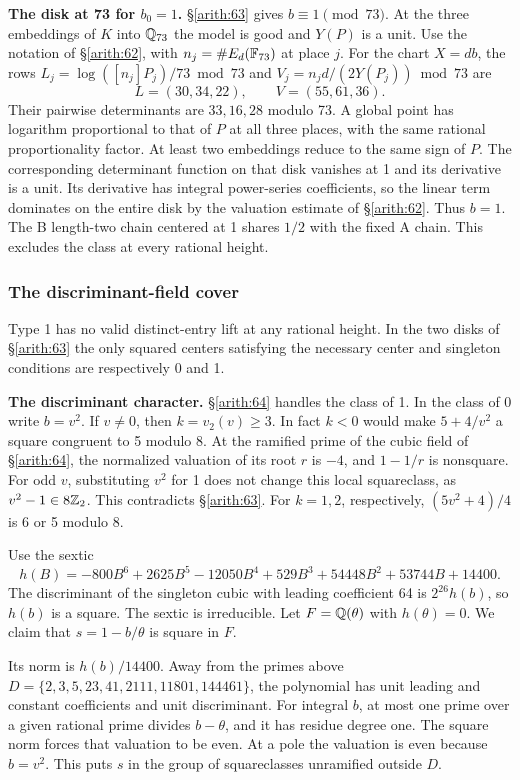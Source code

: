 \textbf{The disk at 73 for \(b_0=1\).} \S\ref{arith:63} gives
\(b\equiv1\pmod{73}\). At the three embeddings of \(K\) into
\(\mathbb Q_{73}\) the model is good and \(Y(P)\) is a unit.
Use the notation of \S\ref{arith:62}, with \(n_j=\#E_d(\mathbb F_{73})\) at
place \(j\). For the chart \(X=db\), the rows
\(L_j=\log([n_j]P_j)/73\bmod73\) and
\(V_j=n_jd/(2Y(P_j))\bmod73\) are
\[L=(30,34,22),\qquad V=(55,61,36).\]
Their pairwise determinants are \(33,16,28\) modulo 73. A global point
has logarithm proportional to that of \(P\) at all three places, with
the same rational proportionality factor. At least two embeddings
reduce to the same sign of \(P\). The corresponding determinant
function on that disk vanishes at 1 and its derivative is a unit.
Its derivative has integral power-series coefficients, so the
linear term dominates on the entire disk by the valuation estimate
of \S\ref{arith:62}. Thus \(b=1\). The B length-two chain centered at 1 shares
\(1/2\) with the fixed A chain. This excludes the class at every
rational height.

\subsubsection{The discriminant-field cover}\label{arith:65}

Type 1 has no valid distinct-entry lift at any rational height.
In the two disks of \S\ref{arith:63} the only squared centers satisfying the
necessary center and singleton conditions are respectively 0 and 1.

\textbf{The discriminant character.} \S\ref{arith:64} handles the class of 1.
In the class of 0 write \(b=v^2\). If \(v\ne0\), then \(k=v_2(v)\ge3\).
In fact \(k<0\) would make \(5+4/v^2\) a square congruent to 5 modulo 8.
At the ramified prime of the cubic field of \S\ref{arith:64}, the normalized
valuation of its root \(r\) is \(-4\), and \(1-1/r\) is nonsquare.
For odd \(v\), substituting \(v^2\) for 1 does not change this local
squareclass, as \(v^2-1\in8\mathbb Z_2\). This contradicts \S\ref{arith:63}.
For \(k=1,2\), respectively, \((5v^2+4)/4\) is 6 or 5 modulo 8.

Use the sextic
\[h(B)=-800B^6+2625B^5-12050B^4+529B^3+54448B^2+53744B+14400.\]
The discriminant of the singleton cubic with leading coefficient 64 is
\(2^{26}h(b)\), so \(h(b)\) is a square. The sextic is irreducible.
Let \(F=\mathbb Q(\theta)\) with \(h(\theta)=0\). We claim that
\(s=1-b/\theta\) is square in \(F\).

Its norm is \(h(b)/14400\). Away from the primes above
\(D=\{2,3,5,23,41,2111,\allowbreak 11801,144461\}\), the polynomial has unit leading
and constant coefficients and unit discriminant. For integral \(b\), at
most one prime over a given rational prime divides \(b-\theta\), and it
has residue degree one. The square norm forces that valuation to be even.
At a pole the valuation is even because \(b=v^2\). This puts \(s\) in
the group of squareclasses unramified outside \(D\).

